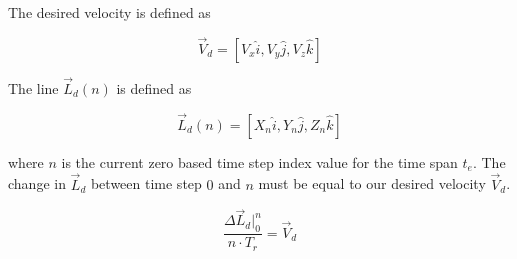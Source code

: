 
The desired velocity is defined as

\begin{equation}
\vec{V}_d = [V_x\hat{i}, V_y\hat{j}, V_z\hat{k}]
\end{equation}




The line $\vec{L}_d(n)$ is defined as

\begin{equation}
\vec{L}_d(n) = [X_n\hat{i}, Y_n\hat{j} , Z_n\hat{k}]
\end{equation}

where $n$ is the current zero based time step index value for the time span $t_e$.  The change in $\vec{L}_d$ between time step $0$ and $n$ must be equal to our desired velocity $\vec{V}_d$.


\begin{equation}
\frac{\Delta \vec{L}_d|_{0}^{n}}{n \cdot T_r} = \vec{V}_d
\end{equation}



